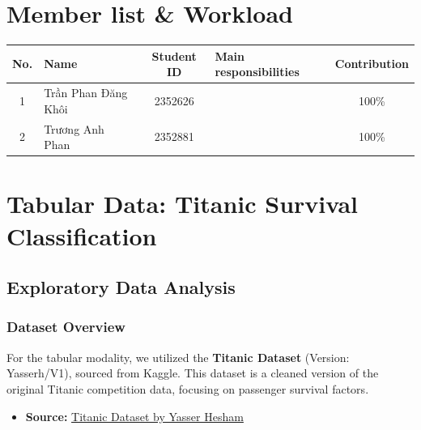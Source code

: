 \documentclass[twoside]{hcmut-report}
\begin{document}
\section*{Member list \& Workload}
\begin{center}
\begin{table}[h]
\renewcommand\thetable{1}
\centering
\small
\begin{tabular}{|c|l|c|p{6cm}|c|}
\hline
\textbf{No.} & \textbf{Name } & \textbf{Student ID} &
\textbf{Main responsibilities} & \textbf{Contribution} \\
\hline
1 & Trần Phan Đăng Khôi &  2352626 &
 & 100\% \\
\hline
2 & Trương Anh Phan & 2352881 &
 & 100\% \\
\hline
\end{tabular}
\end{table}

\end{center}
\clearpage
 

\tableofcontents

\clearpage



\section{Tabular Data: Titanic Survival Classification}
\label{sec:tabular}

\subsection{Exploratory Data Analysis}

\subsubsection{Dataset Overview}
For the tabular modality, we utilized the \textbf{Titanic Dataset} (Version: Yasserh/V1), sourced from Kaggle. This dataset is a cleaned version of the original Titanic competition data, focusing on passenger survival factors.

\begin{itemize}
    \item \textbf{Source:} \href{https://www.kaggle.com/datasets/yasserh/titanic-dataset}{Titanic Dataset by Yasser Hesham}
\end{itemize}
\end{document}
